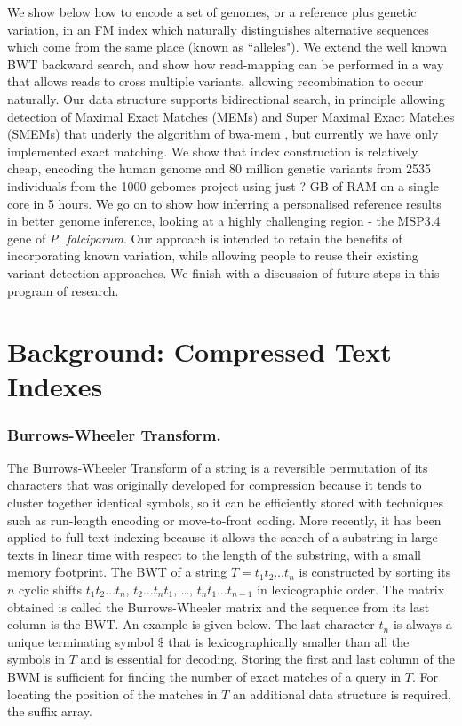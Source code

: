 \documentclass[runningheads,a4paper]{llncs}
\begin{document}
 We show below how to encode a set of genomes, or a reference plus  genetic variation, in an FM index which naturally distinguishes alternative sequences which come from the same place (known as ``alleles"). We extend the well known BWT backward search, and show how read-mapping can be performed in a way that allows reads to cross multiple variants, allowing recombination to occur naturally. Our data structure  supports bidirectional search, in principle allowing detection of Maximal Exact Matches (MEMs) and Super Maximal Exact Matches (SMEMs) that underly the algorithm of bwa-mem \cite{bwa}, but currently we have only implemented exact matching. We show that index construction is relatively cheap, encoding the human genome and 80 million genetic variants from 2535 individuals from the 1000 gebomes project using just ? GB of RAM on a single core in 5 hours. We go on to show how inferring a personalised reference results in better genome inference, looking at a highly challenging region - the MSP3.4 gene of \textit{P. falciparum}. Our approach is intended to retain the benefits of incorporating known variation, while allowing people to reuse their existing variant detection approaches. We finish with a discussion of future steps in this program of research.

\section{Background: Compressed Text Indexes}

\subsubsection{Burrows-Wheeler Transform.}
The Burrows-Wheeler Transform of a string is a reversible permutation of its characters that was originally developed for compression because it tends to cluster together identical symbols, so it can be efficiently stored with techniques such as run-length encoding or move-to-front coding. More recently, it has been applied to full-text indexing because it allows the search of a substring in large texts in linear time with respect to the length of the substring, with a small memory footprint. The BWT of a string $T=t_1t_2 \ldots t_n$ is constructed by sorting its $n$ cyclic shifts $t_1t_2 \ldots t_n$, $t_2 \ldots t_n t_1$, \ldots,  $t_n t_1 \ldots t_{n-1}$ in lexicographic order. The matrix obtained is called the Burrows-Wheeler matrix and the sequence from its last column is the BWT. An example is given below. The last character $t_n$ is always a unique terminating symbol $\$$ that is lexicographically smaller than all the symbols in $T$ and is essential for decoding. Storing the first and last column of the BWM is sufficient for finding the number of exact matches of a query in $T$. For locating the position of the matches in $T$ an additional data structure is required, the suffix array. 
\end{document}
